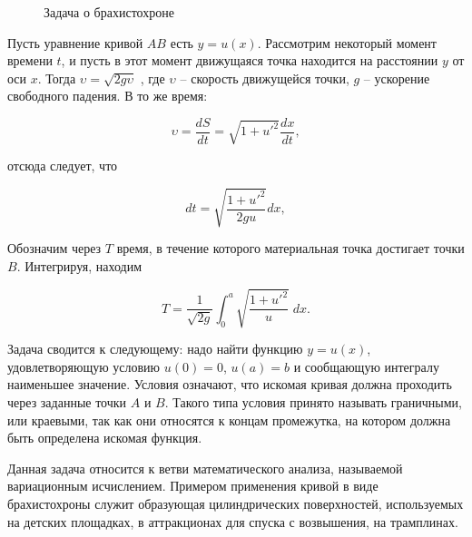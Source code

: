 \documentclass{article}
\begin{document}
\begin{figure}[h!]
\caption{Задача о брахистохроне}
\label{img_brachistochrone}
\end{figure}

Пусть уравнение кривой $AB$ есть $y = u(x)$. Рассмотрим некоторый момент времени $t$, и пусть в этот момент движущаяся точка находится на расстоянии $y$ от оси $x$. Тогда $\upsilon = \sqrt{2g\upsilon}$ , где $\upsilon$ – скорость движущейся точки, $g$ – ускорение свободного падения. В то же время:

\begin{equation}
    \upsilon = \frac{dS}{dt} = \sqrt{1 + u'^2} \frac{dx}{dt},
\end{equation}

\noindent отсюда следует, что

\begin{equation}
    dt = \sqrt{\frac{1 + u'^2}{2gu}}dx,
\end{equation}

\noindent Обозначим через $T$ время, в течение которого материальная точка достигает точки $B$. Интегрируя, находим

\begin{equation}
    T = \frac{1}{\sqrt{2g}} \int_{0}^{a} \sqrt{\frac{1 + u'^2}{u}} \; dx.
\end{equation}

\noindent Задача сводится к следующему: надо найти функцию $y = u(x)$, удовлетворяющую условию $u(0) = 0$, $u(a) = b$ и сообщающую интегралу наименьшее значение. Условия означают, что искомая кривая должна проходить через заданные точки $A$ и $B$. Такого типа условия принято называть граничными, или краевыми, так как они относятся к концам промежутка, на котором должна быть определена искомая функция.

\begin{info}
	Данная задача относится к ветви математического анализа, называемой вариационным исчислением. Примером применения кривой в виде брахистохроны служит образующая цилиндрических поверхностей, используемых на детских площадках, в аттракционах для спуска с возвышения, на трамплинах.
\end{info}
\end{document}
